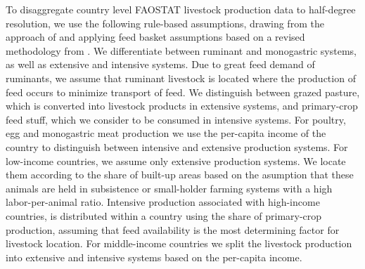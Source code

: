 \documentclass[gc, manuscript]{copernicus}
\begin{document}
To disaggregate country level FAOSTAT livestock production data to half-degree resolution, we use the following rule-based assumptions, drawing from the approach of \citep{robinson_mapping_2014} and applying feed basket assumptions based on a revised methodology from \citep{weindl_livestock_2017}. We differentiate between ruminant and monogastric systems, as well as extensive and intensive systems.
Due to great feed demand of ruminants, we assume that ruminant livestock is located where the production of feed occurs to minimize transport of feed. We distinguish between grazed pasture, which is converted into livestock products in extensive systems, and primary-crop feed stuff, which we consider to be consumed in intensive systems.
For poultry, egg and monogastric meat production we use the per-capita income of the country to distinguish between intensive and extensive production systems. For low-income countries, we assume only extensive production systems. We locate them according to the share of built-up areas based on the asumption that these animals are held in subsistence or small-holder farming systems with a high labor-per-animal ratio. Intensive production associated with high-income countries, is distributed within a country using the share of primary-crop production, assuming that feed availability is the most determining factor for livestock location. For middle-income countries we split the livestock production into extensive and intensive systems based on the per-capita income.
\end{document}
